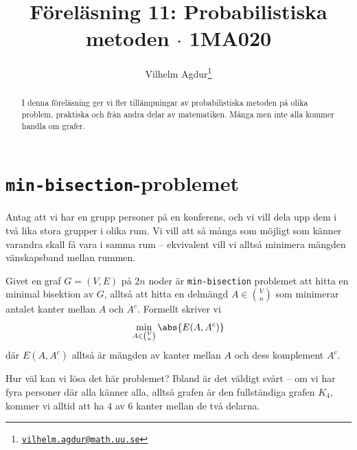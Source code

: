 \documentclass[nobib]{tufte-handout}
\title{Föreläsning 11: Probabilistiska metoden $\cdot$ 1MA020}
\author[Vilhelm Agdur]{Vilhelm Agdur\thanks{\href{mailto:vilhelm.agdur@math.uu.se}{\nolinkurl{vilhelm.agdur@math.uu.se}}}}
\begin{document}

\maketitle%

\begin{abstract}
\noindent
I denna föreläsning ger vi fler tillämpningar av probabilistiska metoden på olika problem, praktiska och från andra delar av matematiken. Många men inte alla kommer handla om grafer.
\end{abstract}

\section{\texttt{min-bisection}-problemet}

Antag att vi har en grupp personer på en konferens, och vi vill dela upp dem i två lika stora grupper i olika rum. Vi vill att så många som möjligt som känner varandra skall få vara i samma rum -- ekvivalent vill vi alltså minimera mängden vänskapsband mellan rummen.

\begin{definition}
  Givet en graf $G = (V, E)$ på $2n$ noder är \texttt{min-bisection} problemet att hitta en minimal bisektion av $G$, alltså att hitta en delmängd $A \in \binom{V}{n}$ som minimerar antalet kanter mellan $A$ och $A^c$. Formellt skriver vi
  $$\min_{A \in \binom{V}{n}} \abs{E(A, A^c)}$$
  där $E(A, A^c)$ alltså är mängden av kanter mellan $A$ och dess komplement $A^c$.
\end{definition}

Hur väl kan vi lösa det här problemet? Ibland är det väldigt svårt -- om vi har fyra personer där alla känner alla, alltså grafen är den fullständiga grafen $K_4$, kommer vi alltid att ha $4$ av $6$ kanter mellan de två delarna.
\end{document}

